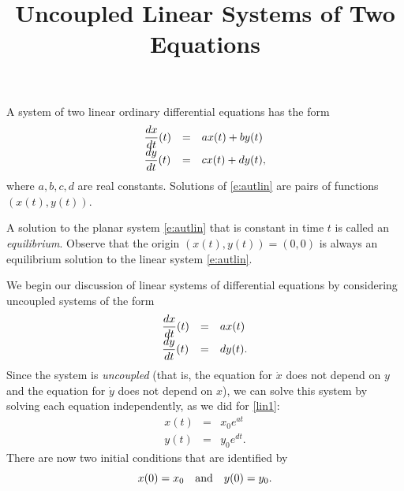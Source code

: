 \documentclass{ximera}
\title{Uncoupled Linear Systems of Two Equations}
\begin{document}
\begin{abstract}
\end{abstract}
\maketitle


\label{sec:UncoupledLS}

A system of two linear ordinary differential equations 
has the form
\renewcommand{\arraystretch}{1.8}
\begin{equation} \label{e:autlin}
\begin{array}{lll}
\displaystyle \frac{dx}{dt}(t)  & = & a x(t) + b y(t) \\
\displaystyle \frac{dy}{dt}(t)  & = & c x(t) + d y(t),
\end{array}
\end{equation}
\renewcommand{\arraystretch}{1.0}%
where $a,b,c,d$ are real constants.  Solutions of \eqref{e:autlin} are 
pairs of functions $(x(t),y(t))$.  

A solution to the planar system \eqref{e:autlin} that is constant in time $t$ is called 
an {\em equilibrium}.  Observe that the origin $(x(t),y(t))=(0,0)$ is always an equilibrium 
solution to the linear system \eqref{e:autlin}. 

We begin our discussion of linear systems of 
differential equations by considering uncoupled
systems of the form
\renewcommand{\arraystretch}{1.8}
\begin{equation} \label{lin2}
\begin{array}{lll}
\displaystyle \frac{dx}{dt}(t) & = & a x(t) \\
\displaystyle \frac{dy}{dt}(t) & = & d y(t).
\end{array}
\end{equation}
\renewcommand{\arraystretch}{1.0}%
Since the system is {\em uncoupled\/} (that is, the equation for
$\dot{x}$ does not depend on $y$ and the equation for $\dot{y}$
does not depend on $x$), we can solve this system by solving each
equation independently, as we did for \eqref{lin1}:
\begin{equation} \label{e:explicitsoln}
\begin{array}{ccc}
x(t) & = & x_0e^{at} \\
y(t) & = & y_0e^{dt}.
\end{array}
\end{equation}
There are now two initial conditions that are identified by
\[
x(0) = x_0 \quad\mbox{and}\quad y(0) = y_0.
\]
\end{document}
